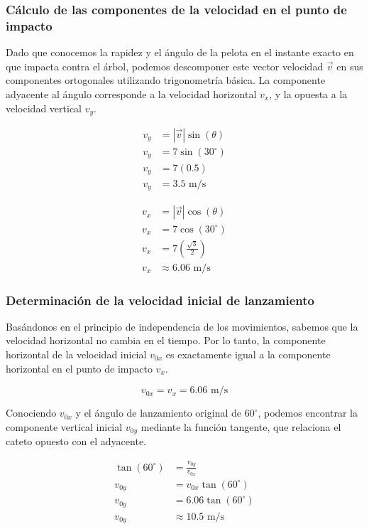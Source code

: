 \documentclass[12pt, a4paper]{article}
\begin{document}
\subsubsection*{Cálculo de las componentes de la velocidad en el punto de impacto}

Dado que conocemos la rapidez y el ángulo de la pelota en el instante exacto en que impacta contra el árbol, podemos descomponer este vector velocidad $\vec{v}$ en sus componentes ortogonales utilizando trigonometría básica. La componente adyacente al ángulo corresponde a la velocidad horizontal $v_x$, y la opuesta a la velocidad vertical $v_y$.

\begin{align*}
v_y &= |\vec{v}| \sin(\theta) \\
v_y &= 7 \sin(30^{\circ}) \\
v_y &= 7 (0.5) \\
v_y &= 3.5 \text{ m/s}
\end{align*}

\begin{align*}
v_x &= |\vec{v}| \cos(\theta) \\
v_x &= 7 \cos(30^{\circ}) \\
v_x &= 7 \left(\frac{\sqrt{3}}{2}\right) \\
v_x &\approx 6.06 \text{ m/s}
\end{align*}

\subsubsection*{Determinación de la velocidad inicial de lanzamiento}

Basándonos en el principio de independencia de los movimientos, sabemos que la velocidad horizontal no cambia en el tiempo. Por lo tanto, la componente horizontal de la velocidad inicial $v_{0x}$ es exactamente igual a la componente horizontal en el punto de impacto $v_x$.

\begin{equation*}
v_{0x} = v_x = 6.06 \text{ m/s}
\end{equation*}

Conociendo $v_{0x}$ y el ángulo de lanzamiento original de $60^{\circ}$, podemos encontrar la componente vertical inicial $v_{0y}$ mediante la función tangente, que relaciona el cateto opuesto con el adyacente.

\begin{align*}
\tan(60^{\circ}) &= \frac{v_{0y}}{v_{0x}} \\
v_{0y} &= v_{0x} \tan(60^{\circ}) \\
v_{0y} &= 6.06 \tan(60^{\circ}) \\
v_{0y} &\approx 10.5 \text{ m/s}
\end{align*}
\end{document}
